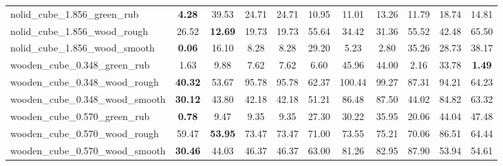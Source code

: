 \begin{table}[H]
{\begin{tabular}{l cccccccccc}
        nolid\_cube\_1.856\_green\_rub & \textbf{4.28} & 39.53 & 24.71 & 24.71 & 10.95 & 11.01 & 13.26 & 11.79 & 18.74 & 14.81 \\
        nolid\_cube\_1.856\_wood\_rough & 26.52 & \textbf{12.69} & 19.73 & 19.73 & 55.64 & 34.42 & 31.36 & 55.52 & 42.48 & 65.50 \\
        nolid\_cube\_1.856\_wood\_smooth & \textbf{0.06} & 16.10 & 8.28 & 8.28 & 29.20 & 5.23 & 2.80 & 35.26 & 28.73 & 38.17 \\
        wooden\_cube\_0.348\_green\_rub & 1.63 & 9.88 & 7.62 & 7.62 & 6.60 & 45.96 & 44.00 & 2.16 & 33.78 & \textbf{1.49} \\
        wooden\_cube\_0.348\_wood\_rough & \textbf{40.32} & 53.67 & 95.78 & 95.78 & 62.37 & 100.44 & 99.27 & 87.31 & 94.21 & 64.23 \\
        wooden\_cube\_0.348\_wood\_smooth & \textbf{30.12} & 43.80 & 42.18 & 42.18 & 51.21 & 86.48 & 87.50 & 44.02 & 84.82 & 63.32 \\
        wooden\_cube\_0.570\_green\_rub & \textbf{0.78} & 9.47 & 9.35 & 9.35 & 27.30 & 30.22 & 35.95 & 20.06 & 44.04 & 47.48 \\
        wooden\_cube\_0.570\_wood\_rough & 59.47 & \textbf{53.95} & 73.47 & 73.47 & 71.00 & 73.55 & 75.21 & 70.06 & 86.51 & 64.44 \\
        wooden\_cube\_0.570\_wood\_smooth & \textbf{30.46} & 44.03 & 46.37 & 46.37 & 63.00 & 81.26 & 82.95 & 87.90 & 53.94 & 54.61 \\
        \bottomrule
    \end{tabular}
    }
\end{table}



\vspace{1cm}

\clearpage

